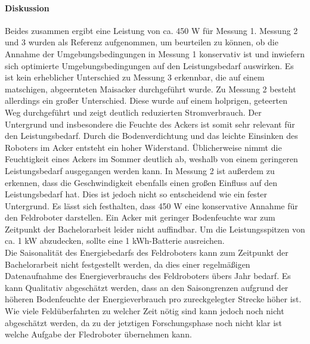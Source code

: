 \paragraph{Diskussion}
Beides zusammen ergibt eine Leistung von ca. 450 W für Messung 1.
Messung 2 und 3 wurden als Referenz aufgenommen, um beurteilen zu können, ob die Annahme der Umgebungsbedingungen in Messung 1 konservativ ist und inwiefern sich optimierte Umgebungsbedingungen auf den Leistungsbedarf auswirken. Es ist kein erheblicher Unterschied zu Messung 3 erkennbar, die auf einem matschigen, abgeernteten Maisacker durchgeführt wurde. Zu Messung 2 besteht allerdings ein großer Unterschied. Diese wurde auf einem holprigen, geteerten Weg durchgeführt und zeigt deutlich reduzierten Stromverbrauch. Der Untergrund und insbesondere die Feuchte des Ackers ist somit sehr relevant für den Leistungsbedarf. Durch die Bodenverdichtung und das leichte Einsinken des Roboters im Acker entsteht ein hoher Widerstand. Üblicherweise nimmt die Feuchtigkeit eines Ackers im Sommer deutlich ab, weshalb von einem geringeren Leistungsbedarf ausgegangen werden kann. In Messung 2 ist außerdem zu erkennen, dass die Geschwindigkeit ebenfalls einen großen Einfluss auf den Leistungsbedarf hat. Dies ist jedoch nicht so entscheidend wie ein fester Untergrund. Es lässt sich festhalten, dass 450 W eine konservative Annahme für den Feldroboter darstellen. Ein Acker mit geringer Bodenfeuchte war zum Zeitpunkt der Bachelorarbeit leider nicht auffindbar. Um die Leistungsspitzen von ca. 1 kW abzudecken, sollte eine 1 kWh-Batterie ausreichen. \\
Die Saisonalität des Energiebedarfs des Feldroboters kann zum Zeitpunkt der Bachelorarbeit nicht festgestellt werden, da dies einer regelmäßigen Datenaufnahme des Energieverbrauchs des Feldroboters übers Jahr bedarf. Es kann Qualitativ abgeschätzt werden, dass an den Saisongrenzen aufgrund der höheren Bodenfeuchte der Energieverbrauch pro zureckgelegter Strecke höher ist. Wie viele Feldüberfahrten zu welcher Zeit nötig sind kann jedoch noch nicht abgeschätzt werden, da zu der jetztigen Forschungsphase noch nicht klar ist welche Aufgabe der Fledroboter übernehmen kann. \\

